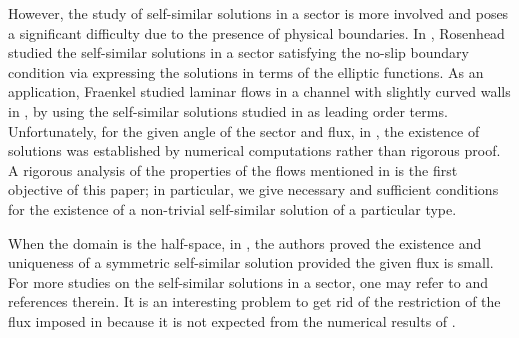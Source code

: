 \documentclass[reqno,12pt]{amsart}
\begin{document}
However, the study of self-similar solutions in a sector is more involved and poses a significant difficulty due to the presence of physical boundaries.
In \cite{Rosenhead40}, Rosenhead studied the self-similar solutions in a sector satisfying the no-slip boundary condition via expressing the solutions in terms of the elliptic functions. 
As an application, Fraenkel studied laminar flows in a channel with slightly curved walls in \cite{Fraenkel62}, by using the self-similar solutions studied in \cite{Rosenhead40} as leading order terms.
 Unfortunately, for the given angle of the sector and flux,  in \cite{Rosenhead40},  the existence of solutions was established by numerical computations rather than rigorous proof. A rigorous analysis of the properties of the flows mentioned in \cite{Rosenhead40, Fraenkel62} is the first objective of this paper; in particular, we give necessary and sufficient conditions for the existence of a non-trivial self-similar solution of a particular type.



    When the domain is the half-space, in \cite[Lemma 5.1] {GaldiPadulaSolonnikov96}, the authors proved the existence and uniqueness of a symmetric self-similar solution provided the given flux is small. For more studies on the self-similar solutions in a sector, one may refer to \cite{Kobayashi14, Kobayashi19, RivkindSolonnikov00} and references therein. 
It is an interesting problem to get rid of the  restriction of the flux imposed in  \cite{GaldiPadulaSolonnikov96, Kobayashi14} because it is not expected from the numerical results of \cite{Rosenhead40}.
\end{document}
